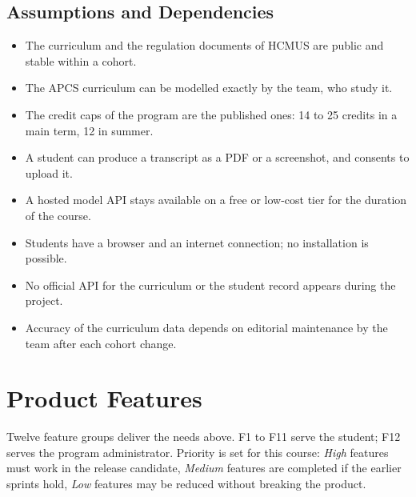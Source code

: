 \documentclass{article}
\begin{document}
\subsection{Assumptions and Dependencies}
\begin{itemize}
  \item The curriculum and the regulation documents of HCMUS are public and stable within a cohort.
  \item The APCS curriculum can be modelled exactly by the team, who study it.
  \item The credit caps of the program are the published ones: 14 to 25 credits in a main term, 12 in summer.
  \item A student can produce a transcript as a PDF or a screenshot, and consents to upload it.
  \item A hosted model API stays available on a free or low-cost tier for the duration of the course.
  \item Students have a browser and an internet connection; no installation is possible.
  \item No official API for the curriculum or the student record appears during the project.
  \item Accuracy of the curriculum data depends on editorial maintenance by the team after each cohort change.
\end{itemize}

\section{Product Features}
Twelve feature groups deliver the needs above. F1 to F11 serve the student; F12 serves the program administrator. Priority
is set for this course: \emph{High} features must work in the release candidate, \emph{Medium} features are completed if the
earlier sprints hold, \emph{Low} features may be reduced without breaking the product.
\end{document}
